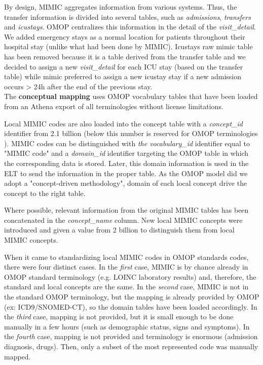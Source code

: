 By design, MIMIC aggregates information from various systems\cite{mimic-omop}.
Thus, the transfer information is divided into several tables, such as
\textit{admissions}, \textit{transfers} and \textit{icustays}. OMOP centralizes
this information in the detail of the \textit{visit\_detail}. 
We added emergency stays as a normal location for patients throughout their 
hospital stay (unlike what had been done by MIMIC). Icustays raw mimic table has 
been removed because it is a table derived from the transfer table \cite{icustays-doc} 
and we decided to assign a new \textit{visit\_detail} for each ICU stay (based on 
the transfer table) while mimic preferred to assign a new icustay stay if a new 
admission occurs > 24h after the end of the previous stay.
\\


The \textbf{conceptual mapping} uses OMOP vocabulary tables that have 
been loaded from an Athena export \cite{ohdsi-athena} of all terminologies 
without license limitations.

Local MIMIC codes are also loaded into the concept table with a \textit{concept\_id}
identifier from 2.1 billion (below this number is reserved for OMOP 
terminologies \cite{omop-documentation-pdf}). 
MIMIC codes can be distinguished with \textit{the vocabulary\_id} identifier equal 
to "MIMIC code" and a \textit{domain\_id} identifier targeting the OMOP table in 
which the corresponding data is stored. Later, this domain information 
is used in the ELT to send the information in the proper table. As the OMOP model 
did we adopt a "concept-driven methodology", domain of each local concept drive 
the concept to the right table.

Where possible, relevant information from the original MIMIC tables has been
concatenated in the \textit{concept\_name} column. New local MIMIC concepts
were introduced and given a value from 2 billion to distinguish them from local
MIMIC concepts.

When it came to standardizing local MIMIC codes in OMOP standards codes, there 
were four distinct cases. In the \emph{first} case, MIMIC is by chance already in 
OMOP standard terminology (e.g. LOINC laboratory results) and, therefore, the standard 
and local concepts are the same. In the \emph{second} case, MIMIC is not in the 
standard OMOP terminology, but the mapping is already provided by OMOP 
(ex: ICD9/SNOMED-CT), so the domain tables have been loaded accordingly. 
In the \emph{third} case, mapping is not provided, but it is small enough to be 
done manually in a few hours (such as demographic status, signs and symptoms). 
In the \emph{fourth} case, mapping is not provided and terminology is enormous 
(admission diagnosis, drugs). Then, only a subset of the most represented code 
was manually mapped.

